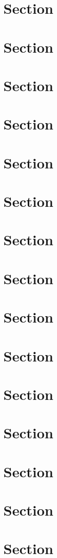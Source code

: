 {{{{\resetchapterfooter

\section{Section}
\label{sec:loremipsum}
\lipsum[1-4]
\section{Section}
\section{Section}
\section{Section}
\section{Section}
\section{Section}
\section{Section}
\section{Section}
\section{Section}
\section{Section}
\lipsum
\section{Section}
\section{Section}
\section{Section}
\section{Section}
\section{Section}
}}}}
